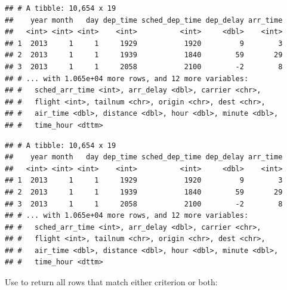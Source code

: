 \documentclass[]{book}
\newenvironment{Shaded}{}{}
\newcommand{\DecValTok}[1]{#1}
\newcommand{\KeywordTok}[1]{\textcolor[rgb]{0.00,0.00,1.00}{#1}}
\newcommand{\NormalTok}[1]{#1}
\newcommand{\OperatorTok}[1]{#1}
\newcommand{\StringTok}[1]{\textcolor[rgb]{0.00,0.50,0.50}{#1}}
\begin{document}
\begin{verbatim}
## # A tibble: 10,654 x 19
##    year month   day dep_time sched_dep_time dep_delay arr_time
##   <int> <int> <int>    <int>          <int>     <dbl>    <int>
## 1  2013     1     1     1929           1920         9        3
## 2  2013     1     1     1939           1840        59       29
## 3  2013     1     1     2058           2100        -2        8
## # ... with 1.065e+04 more rows, and 12 more variables:
## #   sched_arr_time <int>, arr_delay <dbl>, carrier <chr>,
## #   flight <int>, tailnum <chr>, origin <chr>, dest <chr>,
## #   air_time <dbl>, distance <dbl>, hour <dbl>, minute <dbl>,
## #   time_hour <dttm>
\end{verbatim}

\begin{Shaded}
\end{Shaded}

\begin{verbatim}
## # A tibble: 10,654 x 19
##    year month   day dep_time sched_dep_time dep_delay arr_time
##   <int> <int> <int>    <int>          <int>     <dbl>    <int>
## 1  2013     1     1     1929           1920         9        3
## 2  2013     1     1     1939           1840        59       29
## 3  2013     1     1     2058           2100        -2        8
## # ... with 1.065e+04 more rows, and 12 more variables:
## #   sched_arr_time <int>, arr_delay <dbl>, carrier <chr>,
## #   flight <int>, tailnum <chr>, origin <chr>, dest <chr>,
## #   air_time <dbl>, distance <dbl>, hour <dbl>, minute <dbl>,
## #   time_hour <dttm>
\end{verbatim}

Use \texttt{\textbar{}} to return all rows that match either criterion or both:

\begin{Shaded}
\end{Shaded}
\end{document}
